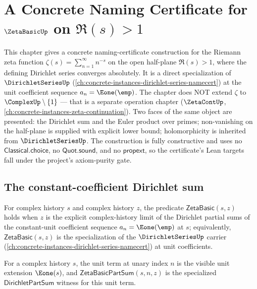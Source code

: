 \chapter{A Concrete Naming Certificate for \(\ZetaBasicUp\) on \(\Re(s) > 1\)}
\label{ch:concrete-instances-zeta-basic-namecert}

This chapter gives a concrete naming-certificate construction for the Riemann zeta function \(\zeta(s) = \sum_{n=1}^{\infty} n^{-s}\) on the open half-plane \(\Re(s) > 1\), where the defining Dirichlet series converges absolutely. It is a direct specialization of \(\DirichletSeriesUp\) (\autoref{ch:concrete-instances-dirichlet-series-namecert}) at the unit coefficient sequence \(a_n = \Eone(\emp)\). The chapter does NOT extend \(\zeta\) to \(\ComplexUp \setminus \{1\}\) --- that is a separate operation chapter (\(\ZetaContUp\), \autoref{ch:concrete-instances-zeta-continuation}). Two faces of the same object are presented: the Dirichlet sum and the Euler product over primes; non-vanishing on the half-plane is supplied with explicit lower bound; holomorphicity is inherited from \(\DirichletSeriesUp\). The construction is fully constructive and uses no \(\mathsf{Classical.choice}\), no \(\mathsf{Quot.sound}\), and no \(\mathsf{propext}\), so the certificate's Lean targets fall under the project's axiom-purity gate.

\section{The constant-coefficient Dirichlet sum}

\begin{definition}
\label{def:zeta-basic}
For complex history \(s\) and complex history \(z\), the predicate \(\mathsf{ZetaBasic}(s, z)\) holds when \(z\) is the explicit complex-history limit of the Dirichlet partial sums of the constant-unit coefficient sequence \(a_n = \Eone(\emp)\) at \(s\); equivalently, \(\mathsf{ZetaBasic}(s, z)\) is the specialization of the \(\DirichletSeriesUp\) carrier (\autoref{ch:concrete-instances-dirichlet-series-namecert}) at unit coefficients.
\end{definition}

\begin{definition}
\label{def:zeta-basic-part-sum}
For a complex history \(s\), the unit term at unary index \(n\) is the visible unit extension \(\Eone(s)\), and \(\mathsf{ZetaBasicPartSum}(s,n,z)\) is the specialized \(\mathsf{DirichletPartSum}\) witness for this unit term.
\end{definition}

